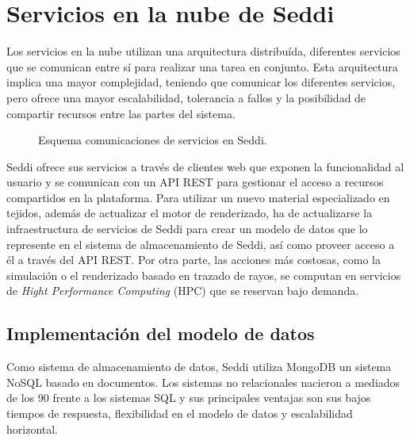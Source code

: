 \section{Servicios en la nube de Seddi}

\bgroup

  Los servicios en la nube utilizan una arquitectura distribu\'ida, diferentes servicios que se comunican entre s\'i para realizar
  una tarea en conjunto. Esta arquitectura implica una mayor complejidad, teniendo que comunicar los diferentes servicios,
  pero ofrece una mayor escalabilidad, tolerancia a fallos y la posibilidad de compartir recursos entre las partes del sistema.

  \begin{figure}[H]
    \vspace{0.5cm}
    \centering
    \caption{Esquema comunicaciones de servicios en Seddi.}
    \vspace{0.5cm}
  \end{figure}

  Seddi ofrece sus servicios a trav\'es de clientes web que exponen la funcionalidad al usuario y se comunican con un API
  REST para gestionar el acceso a recursos compartidos en la plataforma. Para utilizar un nuevo material especializado en tejidos,
  adem\'as de actualizar el motor de renderizado, ha de actualizarse la infraestructura de servicios de Seddi para crear un modelo
  de datos que lo represente en el sistema de almacenamiento de Seddi, as\'i como proveer acceso a \'el a trav\'es del API
  REST. Por otra parte, las acciones m\'as costosas, como la simulaci\'on o el renderizado basado en trazado de rayos, se
  computan en servicios de \textit{Hight Performance Computing} (HPC) que se reservan bajo demanda.


  


\egroup

\subsection{Implementaci\'on del modelo de datos}
Como sistema de almacenamiento de datos, Seddi utiliza MongoDB un sistema NoSQL basado en documentos. Los sistemas no relacionales
nacieron a mediados de los 90 frente a los sistemas SQL y sus principales ventajas son sus bajos tiempos de respuesta, flexibilidad
en el modelo de datos y escalabilidad horizontal.\\

